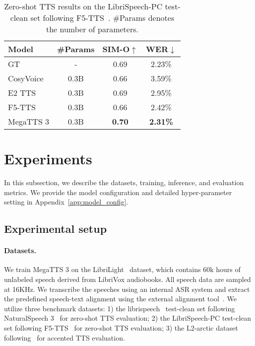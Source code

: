 \begin{table}[!t]
\small
\centering
\begin{tabular}{@{}l|ccc@{}}
\toprule
\bfseries Model & \bfseries \#Params & \bfseries SIM-O$\uparrow$ & \bfseries WER$\downarrow$  \\       
\midrule
GT              & - &  0.69 & 2.23\%   \\
\midrule
CosyVoice       & 0.3B & 0.66 & 3.59\% \\
E2 TTS          & 0.3B & 0.69 & 2.95\% \\
F5-TTS          & 0.3B & 0.66 & 2.42\% \\
\midrule
MegaTTS 3           & 0.3B & \bfseries 0.70 & \bfseries 2.31\% \\
\bottomrule
\end{tabular}
\caption{Zero-shot TTS results on the LibriSpeech-PC test-clean set following F5-TTS~\citep{chen2024f5}. \#Params denotes the number of parameters.}
\label{table:en_zs_tts_valle}
\end{table}

\section{Experiments} 
In this subsection, we describe the datasets, training, inference, and evaluation metrics. We provide the model configuration and detailed hyper-parameter setting in Appendix~\ref{app:model_config}.

\subsection{Experimental setup}
\label{Experimental_Setup}
\paragraph{Datasets.} We train MegaTTS 3 on the LibriLight~\citep{kahn2020libri} dataset, which contains 60k hours of unlabeled speech derived from LibriVox audiobooks. All speech data are sampled at 16KHz. We transcribe the speeches using an internal ASR system and extract the predefined speech-text alignment using the external alignment tool~\citep{mcauliffe2017montreal}. We utilize three benchmark datasets: 1) the librispeech~\citep{panayotov2015librispeech} test-clean set following NaturalSpeech 3~\citep{ju2024naturalspeech} for zero-shot TTS evaluation; 2) the LibriSpeech-PC test-clean set following F5-TTS~\citep{chen2024f5} for zero-shot TTS evaluation; 3) the L2-arctic dataset~\citep{zhao2018l2arctic} following~\citep{melechovsky2022accented,liu2024controllable} for accented TTS evaluation.

